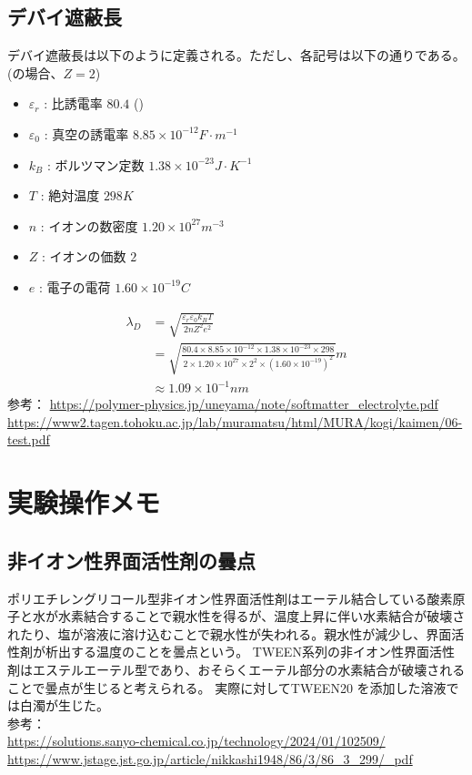 \documentclass{ltjsarticle}
\begin{document}
\subsection{デバイ遮蔽長}
デバイ遮蔽長は以下のように定義される。ただし、各記号は以下の通りである。(の場合、$Z=2$)
\begin{itemize}
  \item $\varepsilon_r$ : 比誘電率 $80.4$ ()
  \item $\varepsilon_0$ : 真空の誘電率 $8.85\times 10^{-12} \si{F\cdot m^{-1}}$
  \item $k_B$ : ボルツマン定数 $1.38\times 10^{-23} \si{J\cdot K^{-1}}$
  \item $T$ : 絶対温度 $298 \si{K}$
  \item $n$ : イオンの数密度 $1.20\times 10^{27} \si{m^{-3}}$
  \item $Z$ : イオンの価数 $2$
  \item $e$ : 電子の電荷 $1.60\times 10^{-19} \si{C}$
\end{itemize}
\begin{equation}
  \begin{split}
    \lambda_D&=\sqrt{\frac{\varepsilon_r \varepsilon_0 k_BT}{2nZ^2e^2}}\\
    &=\sqrt{\frac{80.4\times 8.85\times 10^{-12}\times 1.38\times 10^{-23}\times 298}{2\times 1.20\times 10^{27}\times 2^2\times (1.60\times 10^{-19})^2}} \si{m}\\
    &\approx 1.09 \times 10^{-1} \si{nm}
  \end{split}
\end{equation}
参考：
\url{https://polymer-physics.jp/uneyama/note/softmatter_electrolyte.pdf}\\
\url{https://www2.tagen.tohoku.ac.jp/lab/muramatsu/html/MURA/kogi/kaimen/06-test.pdf}\\

\section{実験操作メモ}
\subsection{非イオン性界面活性剤の曇点}
ポリエチレングリコール型非イオン性界面活性剤はエーテル結合している酸素原子と水が水素結合することで親水性を得るが、温度上昇に伴い水素結合が破壊されたり、塩が溶液に溶け込むことで親水性が失われる。親水性が減少し、界面活性剤が析出する温度のことを曇点という。
TWEEN系列の非イオン性界面活性剤はエステルエーテル型であり、おそらくエーテル部分の水素結合が破壊されることで曇点が生じると考えられる。
実際に対してTWEEN20  を添加した溶液では白濁が生じた。\\
参考：\\
\url{https://solutions.sanyo-chemical.co.jp/technology/2024/01/102509/}\\
\url{https://www.jstage.jst.go.jp/article/nikkashi1948/86/3/86_3_299/_pdf}
\end{document}
